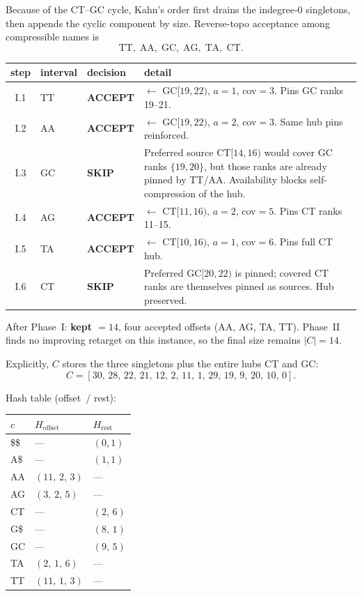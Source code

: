 \documentclass[11pt,a4paper]{article}
\begin{document}
Because of the CT--GC cycle, Kahn's order first drains the
indegree-\(0\) singletons, then appends the cyclic component by size.
Reverse-topo acceptance among compressible names is
\[
\mathrm{TT},\;\mathrm{AA},\;\mathrm{GC},\;\mathrm{AG},\;
\mathrm{TA},\;\mathrm{CT}.
\]

\begin{center}
\small
\begin{tabular}{@{}cllp{7.6cm}@{}}
\toprule
step & interval & decision & detail \\
\midrule
I.1 & TT & \textbf{ACCEPT} &
  \(\leftarrow\) GC\([19,22)\), \(a=1\), cov\({=}3\).
  Pins GC ranks 19--21. \\
I.2 & AA & \textbf{ACCEPT} &
  \(\leftarrow\) GC\([19,22)\), \(a=2\), cov\({=}3\).
  Same hub pins reinforced. \\
I.3 & GC & \textbf{SKIP} &
  Preferred source CT\([14,16)\) would cover GC ranks \(\{19,20\}\),
  but those ranks are already pinned by TT/AA. Availability blocks
  self-compression of the hub. \\
I.4 & AG & \textbf{ACCEPT} &
  \(\leftarrow\) CT\([11,16)\), \(a=2\), cov\({=}5\).
  Pins CT ranks 11--15. \\
I.5 & TA & \textbf{ACCEPT} &
  \(\leftarrow\) CT\([10,16)\), \(a=1\), cov\({=}6\).
  Pins full CT hub. \\
I.6 & CT & \textbf{SKIP} &
  Preferred GC\([20,22)\) is pinned; covered CT ranks are themselves
  pinned as sources. Hub preserved. \\
\bottomrule
\end{tabular}
\end{center}

After Phase~I: \textbf{kept \({=}14\)}, four accepted offsets
(AA, AG, TA, TT). Phase~II finds no improving retarget on this
instance, so the final size remains \(|C|=14\).

Explicitly, \(C\) stores the three singletons plus the entire hubs CT
and GC:
\[
C = [30,\,28,\,22,\,21,\,12,\,2,\,11,\,1,\,29,\,19,\,9,\,20,\,10,\,0].
\]

Hash table (offset~/ rest):

\begin{center}
\begin{tabular}{@{}lll@{}}
\toprule
\(c\) & \(H_{\mathrm{offset}}\) & \(H_{\mathrm{rest}}\) \\
\midrule
\$\$ & --- & \((0,1)\) \\
A\$ & --- & \((1,1)\) \\
AA & \((11,\,2,\,3)\) & --- \\
AG & \((3,\,2,\,5)\)  & --- \\
CT & --- & \((2,\,6)\) \\
G\$ & --- & \((8,\,1)\) \\
GC & --- & \((9,\,5)\) \\
TA & \((2,\,1,\,6)\)  & --- \\
TT & \((11,\,1,\,3)\) & --- \\
\bottomrule
\end{tabular}
\end{center}
\end{document}
